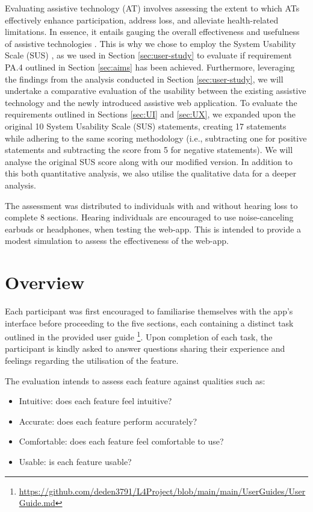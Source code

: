 \documentclass{l4proj}
\begin{document}
Evaluating assistive technology (AT) involves assessing the extent to which ATs effectively enhance participation, address loss, and alleviate health-related limitations. In essence, it entails gauging the overall effectiveness and usefulness of assistive technologies \citep{tao2020evaluation}. This is why we chose to employ the System Usability Scale (SUS) \citep{SUS}, as we used in Section \ref{sec:user-study} to evaluate if requirement PA.4 outlined in Section \ref{sec:aims} has been achieved. Furthermore, leveraging the findings from the analysis conducted in Section \ref{sec:user-study}, we will undertake a comparative evaluation of the usability between the existing assistive technology and the newly introduced assistive web application. To evaluate the requirements outlined in Sections \ref{sec:UI} and \ref{sec:UX}, we expanded upon the original 10 System Usability Scale (SUS) statements, creating 17 statements while adhering to the same scoring methodology (i.e., subtracting one for positive statements and subtracting the score from 5 for negative statements). We will analyse the original SUS score along with our modified version. In addition to this both quantitative analysis, we also utilise the qualitative data for a deeper analysis.

The assessment was distributed to individuals with and without hearing loss to complete 8 sections. Hearing individuals are encouraged to use noise-canceling earbuds or headphones, when testing the web-app. This is intended to provide a modest simulation to assess the effectiveness of the web-app.

\section{Overview}

Each participant was first encouraged to familiarise themselves with the app's interface before proceeding to the five sections, each containing a distinct task outlined in the provided user guide \footnote{\url{https://github.com/deden3791/L4Project/blob/main/main/UserGuides/UserGuide.md}}. Upon completion of each task, the participant is kindly asked to answer questions sharing their experience and feelings regarding the utilisation of the feature.

The evaluation intends to assess each feature against qualities such as:

\begin{itemize}
    \item Intuitive: does each feature feel intuitive?
    \item Accurate: does each feature perform accurately?
    \item Comfortable: does each feature feel comfortable to use?
    \item Usable: is each feature usable?
\end{itemize}
\end{document}
